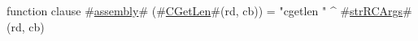function clause #\hyperref[sailMIPSzassembly]{assembly}# (#\hyperref[sailMIPSzCGetLen]{CGetLen}#(rd, cb)) = "cgetlen " ^ #\hyperref[sailMIPSzstrRCArgs]{strRCArgs}#(rd, cb)
